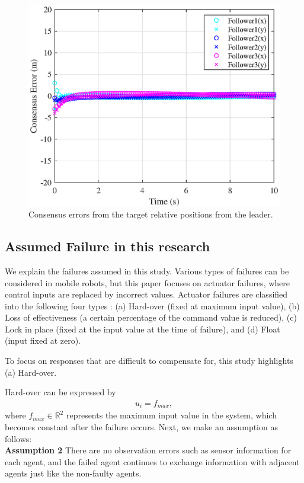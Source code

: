 \documentclass[a4paper,fleqn,10pt,twocolumn]{SICE_ISCS}
\begin{document}
\begin{figure}[t]
	\begin{center}
		\includegraphics[clip,width=\linewidth]{Fig/sampleconsensus.eps}
		\caption{Consensus errors from the target relative positions from the leader.}
		\label{Errorsample}
	\end{center}
	\vspace{-4mm}
\end{figure}

\subsection{Assumed Failure in this research}
We explain the failures assumed in this study. Various types of failures can be considered in mobile robots, but this paper focuses on actuator failures, where control inputs are replaced by incorrect values. Actuator failures are classified into the following four types \cite{4types_fault}:
(a) Hard-over (fixed at maximum input value), 
(b) Loss of effectiveness (a certain percentage of the command value is reduced), 
(c) Lock in place (fixed at the input value at the time of failure), and 
(d) Float (input fixed at zero). 

To focus on responses that are difficult to compensate for, this study highlights (a) Hard-over.

Hard-over can be expressed by
\begin{align}
	u_i = f_{max},
\end{align}
\noindent where $f_{max} \in {\mathbb{R}}^2$ represents the maximum input value in the system, which becomes constant after the failure occurs. Next, we make an assumption as follows:\\
\textbf{Assumption 2} There are no observation errors such as sensor information for each agent, and the failed agent continues to exchange information with adjacent agents just like the non-faulty agents.
\end{document}
